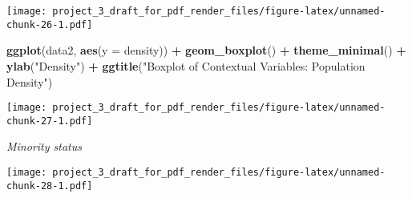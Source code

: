 \documentclass[]{article}
\newenvironment{Shaded}{\begin{snugshade}}{\end{snugshade}}
\newcommand{\DataTypeTok}[1]{\textcolor[rgb]{0.13,0.29,0.53}{#1}}
\newcommand{\DecValTok}[1]{\textcolor[rgb]{0.00,0.00,0.81}{#1}}
\newcommand{\KeywordTok}[1]{\textcolor[rgb]{0.13,0.29,0.53}{\textbf{#1}}}
\newcommand{\NormalTok}[1]{#1}
\newcommand{\OperatorTok}[1]{\textcolor[rgb]{0.81,0.36,0.00}{\textbf{#1}}}
\newcommand{\StringTok}[1]{\textcolor[rgb]{0.31,0.60,0.02}{#1}}
\begin{document}
\texttt{[image: project\_3\_draft\_for\_pdf\_render\_files/figure-latex/unnamed-chunk-26-1.pdf]}

\begin{Shaded}
\begin{Highlighting}[]
\KeywordTok{ggplot}\NormalTok{(data2, }\KeywordTok{aes}\NormalTok{(}\DataTypeTok{y =}\NormalTok{ density)) }\OperatorTok{+}
\StringTok{  }\KeywordTok{geom_boxplot}\NormalTok{() }\OperatorTok{+}
\StringTok{  }\KeywordTok{theme_minimal}\NormalTok{() }\OperatorTok{+}
\StringTok{  }\KeywordTok{ylab}\NormalTok{(}\StringTok{"Density"}\NormalTok{) }\OperatorTok{+}
\StringTok{  }\KeywordTok{ggtitle}\NormalTok{(}\StringTok{"Boxplot of Contextual Variables: Population Density"}\NormalTok{)}
\end{Highlighting}
\end{Shaded}

\texttt{[image: project\_3\_draft\_for\_pdf\_render\_files/figure-latex/unnamed-chunk-27-1.pdf]}

\emph{Minority status}

\begin{Shaded}
\end{Shaded}

\texttt{[image: project\_3\_draft\_for\_pdf\_render\_files/figure-latex/unnamed-chunk-28-1.pdf]}

\begin{Shaded}
\end{Shaded}
\end{document}
